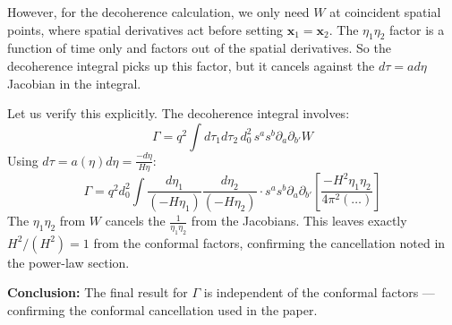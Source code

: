 \documentclass[12pt]{article}
\newcommand{\Scfac}{a}
\newcommand{\Wight}{W}
\newcommand{\pd}{\partial}
\newcommand{\be}{\begin{equation}}
\newcommand{\ee}{\end{equation}}
\newcommand{\lb}{\left}
\newcommand{\rb}{\right}
\begin{document}
However, for the decoherence calculation, we only need $\Wight$ at coincident
spatial points, where spatial derivatives act before setting $\mathbf{x}_1 = \mathbf{x}_2$.
The $\eta_1\eta_2$ factor is a function of time only and factors out of the spatial
derivatives. So the decoherence integral picks up this factor, but it cancels against
the $d\tau = \Scfac d\eta$ Jacobian in the integral.

Let us verify this explicitly. The decoherence integral involves:
\be
  \Gamma = q^2 \int d\tau_1 d\tau_2 \, d_0^2 \, s^a s^b \pd_a \pd_{b'} \Wight
\ee
Using $d\tau = \Scfac(\eta) d\eta = \frac{-d\eta}{H\eta}$:
\be
  \Gamma = q^2 d_0^2 \int \frac{d\eta_1}{(-H\eta_1)} \frac{d\eta_2}{(-H\eta_2)}
  \cdot s^a s^b \pd_a \pd_{b'} \lb[\frac{-H^2\eta_1\eta_2}{4\pi^2(\ldots)}\rb]
\ee
The $\eta_1\eta_2$ from $\Wight$ cancels the $\frac{1}{\eta_1\eta_2}$ from the Jacobians.
This leaves exactly $H^2/(H^2) = 1$ from the conformal factors, confirming the cancellation
noted in the power-law section.

\textbf{Conclusion:} The final result for $\Gamma$ is independent of the conformal
factors --- confirming the conformal cancellation used in the paper.
\end{document}

